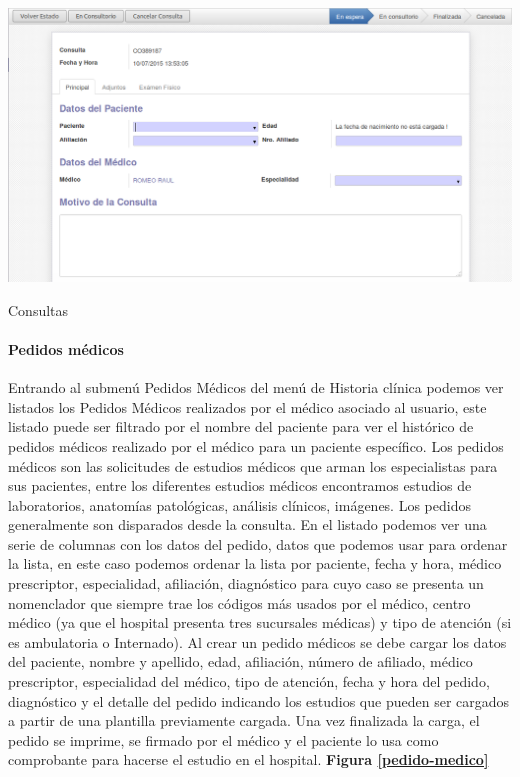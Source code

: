\begin{correccionFigure}[h]
      \centering
      \includegraphics[width=.8\textwidth]{img/tp1/HE/ConsultaDia}
      \caption{Consultas}
      \label{consulta-dia}
\end{correccionFigure}


\paragraph{Pedidos médicos}

Entrando al submenú Pedidos Médicos del menú de Historia clínica podemos ver listados los Pedidos Médicos realizados por el médico asociado al usuario, este listado puede ser filtrado por el nombre del paciente para ver el histórico de pedidos médicos realizado por el médico para un paciente específico. Los pedidos médicos son las solicitudes de estudios médicos que arman los especialistas para sus pacientes, entre los diferentes estudios médicos encontramos estudios de laboratorios, anatomías patológicas, análisis clínicos, imágenes. Los pedidos generalmente son disparados desde la consulta. En el listado podemos ver una serie de columnas con los datos del pedido, datos que podemos usar para ordenar la lista, en este caso podemos ordenar la lista por paciente, fecha y hora, médico prescriptor, especialidad, afiliación, diagnóstico para cuyo caso se presenta un nomenclador que siempre trae los códigos más usados por el médico, centro médico (ya que el hospital presenta tres sucursales médicas) y tipo de atención (si es ambulatoria o Internado). Al crear un pedido médicos se debe cargar los datos del paciente, nombre y apellido, edad, afiliación, número de afiliado, médico prescriptor, especialidad del médico, tipo de atención, fecha y hora del pedido, diagnóstico y el detalle del pedido indicando los estudios que pueden ser cargados a partir de una plantilla previamente cargada. Una vez finalizada la carga, el pedido se imprime, se firmado por el médico y el paciente lo usa como comprobante para hacerse el estudio en el hospital. \textbf{Figura \ref{pedido-medico}}

